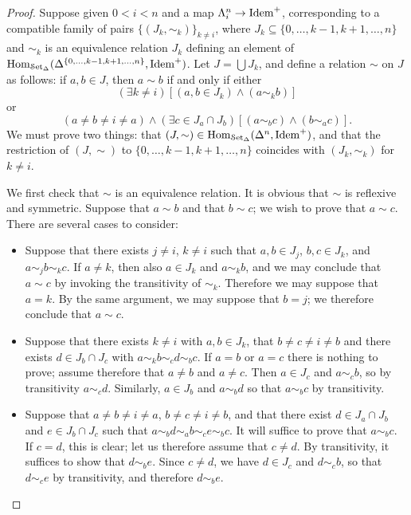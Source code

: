 \begin{proof}
Suppose given $0 < i < n$ and a map $\Lambda^n_i \rightarrow \operatorname{Idem}^{+}$, corresponding
to a compatible family of pairs $\{ ( J_{k}, \sim_{k}) \}_{k \neq i}$, where $J_k \subseteq \{ 0, \ldots, k-1, k+1, \ldots, n \}$ and $\sim_k$ is an equivalence relation $J_{k}$ defining an element of
$\operatorname{Hom}_{\operatorname{\mathcal{S}et_{\Delta}}}( \Delta^{ \{0, \ldots, k-1, k+1, \ldots, n\} }, \operatorname{Idem}^{+})$. Let $J = \bigcup J_{k}$, and
define a relation $\sim$ on $J$ as follows: if $a,b \in J$, then $a \sim b$ if and only if either
$$( \exists k \neq i) [ (a, b \in J_{k}) \wedge (a \sim_{k} b) ]$$
or
$$ ( a \neq b \neq i \neq a) \wedge (\exists c \in J_{a} \cap J_{b}) [ (a \sim_{b} c) \wedge (b \sim_{a} c)].$$
We must prove two things: that $(J, \sim) \in \operatorname{Hom}_{\operatorname{\mathcal{S}et_{\Delta}}}(\Delta^n, \operatorname{Idem}^{+})$, and that the restriction of $(J, \sim)$ to $\{ 0, \ldots, k-1, k+1, \ldots, n\}$ coincides with $(J_k, \sim_k)$ for $k \neq i$.

We first check that $\sim$ is an equivalence relation. It is obvious that $\sim$ is reflexive and symmetric. Suppose that $a \sim b$ and that $b \sim c$; we wish to prove that $a \sim c$. There are several cases to consider:

\begin{itemize}
\item Suppose that there exists $j \neq i$, $k \neq i$ such that $a,b \in J_{j}$, 
$b,c \in J_{k}$, and $a \sim_{j} b \sim_{k} c$. If $a \neq k$, then also $a \in J_{k}$
and $a \sim_{k} b$, and we may conclude that $a \sim c$ by invoking the transitivity
of $\sim_{k}$. Therefore we may suppose that $a = k$. By the same argument, we may suppose
that $b = j$; we therefore conclude that $a \sim c$.

\item Suppose that there exists $k \neq i$ with $a,b \in J_k$, that $b \neq c \neq i \neq b$
and there exists $d \in J_{b} \cap J_{c}$ with $a \sim_{k} b \sim_{c} d \sim_{b} c$. If $a = b$ or $a=c$ there is nothing to prove; assume therefore that $a \neq b$ and $a \neq c$. Then $a \in J_{c}$
and $a \sim_{c} b$, so by transitivity $a \sim_{c} d$. Similarly, $a \in J_{b}$ and $a \sim_{b} d$
so that $a \sim_{b} c$ by transitivity. 

\item Suppose that $a \neq b \neq i \neq a$, $b \neq c \neq i \neq b$, and that there
exist $d \in J_{a} \cap J_{b}$ and $e \in J_{b} \cap J_{c}$ such that
$a \sim_{b} d \sim_{a} b \sim_{c} e \sim_{b} c$. It will suffice to prove that $a \sim_{b} c$. If $c = d$, this is clear; let us therefore assume that $c \neq d$.
By transitivity, it suffices to show that $d \sim_{b} e$. Since $c \neq d$, we have
$d \in J_{c}$ and $d \sim_{c} b$, so that $d \sim_{c} e$ by transitivity, and therefore
$d \sim_{b} e$.
\end{itemize}


\end{proof}
